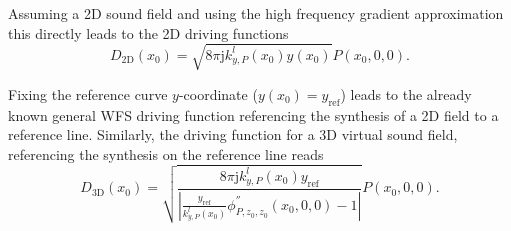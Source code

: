 \documentclass[12pt,a4paper]{article}
\newcommand{\ti}{\mathrm{j}}
\newcommand{\yref}{y_{\mathrm{ref}}}
\begin{document}
Assuming a 2D sound field and using the high frequency gradient approximation this directly leads to the 2D driving functions
\begin{equation}
D_{2\mathrm{D}}(x_0) = 
\sqrt{ 8\pi \ti k^l_{y,P}(x_0) y(x_0) }
 P(x_0,0,0).
\end{equation}

Fixing the reference curve $y$-coordinate ($y(x_0) = \yref$) leads to the already known general WFS driving function referencing the synthesis of a 2D field to a reference line. Similarly, the driving function for a 3D virtual sound field, referencing the synthesis on the reference line reads
\begin{equation}
D_{3\mathrm{D}}(x_0) = 
\sqrt{ \frac{8\pi \ti k^l_{y,P}(x_0) \yref }{\left| \frac{\yref}{k^l_{y,P}(x_0)}\phi^{''}_{P,z_0,z_0}(x_0,0,0	) - 1 \right|}} P(x_0,0,0)	.
\end{equation}
\end{document}

